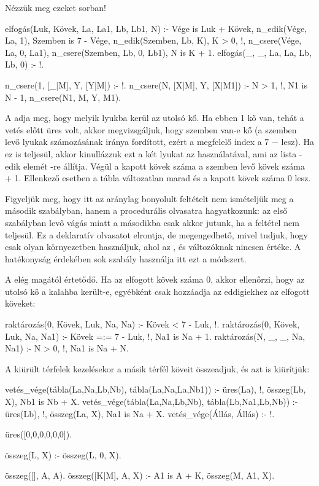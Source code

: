 Nézzük meg ezeket sorban!
\begin{program}
elfogás(Luk, Kövek, La, La1, Lb, Lb1, N) :-
    Vége is Luk + Kövek,
    n_edik(Vége, La, 1),
    Szemben is 7 - Vége,
    n_edik(Szemben, Lb, K),
    K > 0, !, %
    n_csere(Vége, La, 0, La1),
    n_csere(Szemben, Lb, 0, Lb1),
    N is K + 1.
elfogás(_, _, La, La, Lb, Lb, 0) :- !.

n_csere(1, [_|M], Y, [Y|M]) :- !.
n_csere(N, [X|M], Y, [X|M1]) :-
    N > 1, !, N1 is N - 1,
    n_csere(N1, M, Y, M1).
\end{program}
A  adja meg, hogy melyik lyukba kerül az
utolsó kő. Ha ebben 1 kő van, tehát a vetés előtt
üres volt, akkor megvizsgáljuk, hogy szemben van-e
kő (a szemben levő lyukak számozásának iránya
fordított, ezért a megfelelő index a 7 $-$ 
lesz). Ha ez is teljesül, akkor kinullázzuk ezt a
két lyukat az 
használatával, ami az  lista -edik
elemét -re állítja. Végül a kapott kövek száma
a szemben levő kövek száma + 1. Ellenkező esetben a
tábla változatlan marad és a kapott kövek száma 0
lesz.

Figyeljük meg, hogy itt az aránylag bonyolult
feltételt nem ismételjük meg a második szabályban,
hanem a procedurális olvasatra hagyatkozunk: az első
szabályban levő vágás miatt a másodikba csak akkor
jutunk, ha a feltétel nem teljesül. Ez a deklaratív
olvasatot elrontja, de megengedhető, mivel tudjuk,
hogy csak olyan környezetben használjuk, ahol az
,  és  változóknak nincsen
értéke. A hatékonyság érdekében sok szabály
használja itt ezt a módszert.

A  elég magától értetődő. Ha az
elfogott kövek száma 0, akkor ellenőrzi, hogy az
utolsó kő a kalahba került-e, egyébként csak
hozzáadja az eddigiekhez az elfogott köveket:
\begin{program}
raktározás(0, Kövek, Luk, Na, Na) :-
    Kövek < 7 - Luk, !.
raktározás(0, Kövek, Luk, Na, Na1) :-
    Kövek =:= 7 - Luk, !, Na1 is Na + 1.
raktározás(N, _, _, Na, Na1) :-
    N > 0, !, Na1 is Na + N.
\end{program}

A kiürült térfelek kezelésekor a másik térfél köveit
összeadjuk, és azt is kiürítjük:
\begin{program}
vetés_vége(tábla(La,Na,Lb,Nb),
           tábla(La,Na,La,Nb1)) :-
    üres(La), !, összeg(Lb, X), Nb1 is Nb + X.
vetés_vége(tábla(La,Na,Lb,Nb),
           tábla(Lb,Na1,Lb,Nb)) :-
    üres(Lb), !, összeg(La, X), Na1 is Na + X.
vetés_vége(Állás, Állás) :- !.

üres([0,0,0,0,0,0]).

összeg(L, X) :- összeg(L, 0, X).

összeg([], A, A).
összeg([K|M], A, X) :-
    A1 is A + K,
    összeg(M, A1, X).
\end{program}

